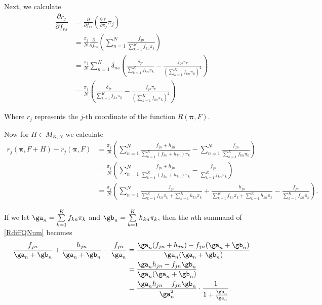 Next, we calculate
\begin{align}\label{partialRF}
\dfrac{\partial r_j}{\partial f_{rs}}&=\frac{\partial}{\partial f_{rs}}\left(\frac{\partial\ell}{\partial\pi_j}\pi_j\right)\nonumber \\
									 &=\frac{\pi_j}{N}\frac{\partial}{\partial f_{rs}}\left(\sum\limits_{n=1}^N \frac{f_{jn}}{\sum\limits_{k=1}^{K}f_{kn}\pi_k}\right)\nonumber \\
									 &=\frac{\pi_j}{N}\sum_{n=1}^{N}\delta_{ns}\left(\frac{\delta_{jr}}{\sum\limits_{k=1}^{K}f_{kn}\pi_k}-\frac{f_{js}\pi_r}{\left(\sum\limits_{k=1}^{K}f_{kn}\pi_k\right)^2}\right) \nonumber \\
									 &=\frac{\pi_j}{N}\left(\frac{\delta_{jr}}{\sum\limits_{k=1}^{K}f_{ks}\pi_k}-\frac{f_{js}\pi_r}{\left(\sum\limits_{k=1}^{K}f_{ks}\pi_k\right)^2}\right)
\end{align}

Where $r_j$ represents the $j$-th coordinate of the function $R(\bm\pi,F)$.  

Now for $H\in M_{K, N}$ we calculate
\begin{align}\label{RdiffQNum}
r_j(\bm\pi,F+H)-r_j(\bm\pi, F)&= \frac{\pi_j}{N}\left(\sum\limits_{n=1}^N \frac{f_{jn}+h_{jn}}{\sum\limits_{k=1}^{K}(f_{kn}+h_{kn})\pi_k}-\sum\limits_{n=1}^N \frac{f_{jn}}{\sum\limits_{k=1}^{K}f_{kn}\pi_k}\right)\nonumber \\
			   				  &=\frac{\pi_j}{N}\left(\sum\limits_{n=1}^N \frac{f_{jn}+h_{jn}}{\sum\limits_{k=1}^{K}(f_{kn}+h_{kn})\pi_k}- \frac{f_{jn}}{\sum\limits_{k=1}^{K}f_{kn}\pi_k}\right) \nonumber \\
			   				  &=\frac{\pi_j}{N}\left(\sum\limits_{n=1}^N \frac{f_{jn}}{\sum\limits_{k=1}^{K}f_{kn}\pi_k+\sum\limits_{k=1}^{K}h_{kn}\pi_k}+\frac{h_{jn}}{\sum\limits_{k=1}^{K}f_{kn}\pi_k+\sum\limits_{k=1}^{K}h_{kn}\pi_k}- \frac{f_{jn}}{\sum\limits_{k=1}^{K}f_{kn}\pi_k}\right).
\end{align}

If we let $\ga_n=\sum\limits_{k=1}^{K}f_{kn}\pi_k$ and $\gb_n=\sum\limits_{k=1}^{K}h_{kn}\pi_k$, then the $n$th summand of \ref{RdiffQNum} becomes
\begin{align}\label{diffFrac}
\frac{f_{jn}}{\ga_n+\gb_n}+\frac{h_{jn}}{\ga_n+\gb_n}-\frac{f_{jn}}{\ga_n}&=\frac{\ga_n(f_{jn}+h_{jn})-f_{jn}(\ga_n+\gb_n)}{\ga_n(\ga_n+\gb_n)}\nonumber \\
																		  &=\frac{\ga_nh_{jn}-f_{jn}\gb_n}{\ga_n(\ga_n+\gb_n)}\nonumber \\
																		  &=\frac{\ga_nh_{jn}-f_{jn}\gb_n}{\ga_n^2}\cdot\frac{1}{1+\frac{\gb_n}{\ga_n}}.
\end{align}

